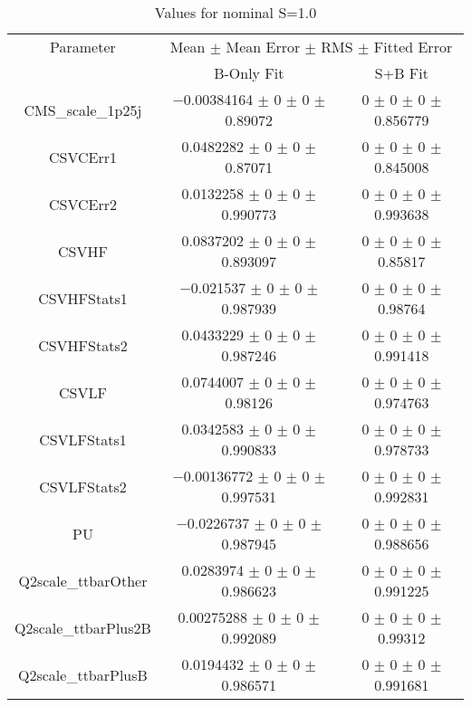 \begin{table}
\centering
\caption{Values for nominal S=1.0}
\begin{tabular}{ccc}
\toprule
Parameter & \multicolumn{2}{c}{Mean $\pm$ Mean Error $\pm$ RMS $\pm$ Fitted Error}\\
 & B-Only Fit & S+B Fit\\
\midrule
CMS\_scale\_1p25j & \num{-0.00384164} $\pm$ \num{0} $\pm$ \num{0} $\pm$ \num{0.89072} & \num{0} $\pm$ \num{0} $\pm$ \num{0} $\pm$ \num{0.856779}\\
CSVCErr1 & \num{0.0482282} $\pm$ \num{0} $\pm$ \num{0} $\pm$ \num{0.87071} & \num{0} $\pm$ \num{0} $\pm$ \num{0} $\pm$ \num{0.845008}\\
CSVCErr2 & \num{0.0132258} $\pm$ \num{0} $\pm$ \num{0} $\pm$ \num{0.990773} & \num{0} $\pm$ \num{0} $\pm$ \num{0} $\pm$ \num{0.993638}\\
CSVHF & \num{0.0837202} $\pm$ \num{0} $\pm$ \num{0} $\pm$ \num{0.893097} & \num{0} $\pm$ \num{0} $\pm$ \num{0} $\pm$ \num{0.85817}\\
CSVHFStats1 & \num{-0.021537} $\pm$ \num{0} $\pm$ \num{0} $\pm$ \num{0.987939} & \num{0} $\pm$ \num{0} $\pm$ \num{0} $\pm$ \num{0.98764}\\
CSVHFStats2 & \num{0.0433229} $\pm$ \num{0} $\pm$ \num{0} $\pm$ \num{0.987246} & \num{0} $\pm$ \num{0} $\pm$ \num{0} $\pm$ \num{0.991418}\\
CSVLF & \num{0.0744007} $\pm$ \num{0} $\pm$ \num{0} $\pm$ \num{0.98126} & \num{0} $\pm$ \num{0} $\pm$ \num{0} $\pm$ \num{0.974763}\\
CSVLFStats1 & \num{0.0342583} $\pm$ \num{0} $\pm$ \num{0} $\pm$ \num{0.990833} & \num{0} $\pm$ \num{0} $\pm$ \num{0} $\pm$ \num{0.978733}\\
CSVLFStats2 & \num{-0.00136772} $\pm$ \num{0} $\pm$ \num{0} $\pm$ \num{0.997531} & \num{0} $\pm$ \num{0} $\pm$ \num{0} $\pm$ \num{0.992831}\\
PU & \num{-0.0226737} $\pm$ \num{0} $\pm$ \num{0} $\pm$ \num{0.987945} & \num{0} $\pm$ \num{0} $\pm$ \num{0} $\pm$ \num{0.988656}\\
Q2scale\_ttbarOther & \num{0.0283974} $\pm$ \num{0} $\pm$ \num{0} $\pm$ \num{0.986623} & \num{0} $\pm$ \num{0} $\pm$ \num{0} $\pm$ \num{0.991225}\\
Q2scale\_ttbarPlus2B & \num{0.00275288} $\pm$ \num{0} $\pm$ \num{0} $\pm$ \num{0.992089} & \num{0} $\pm$ \num{0} $\pm$ \num{0} $\pm$ \num{0.99312}\\
Q2scale\_ttbarPlusB & \num{0.0194432} $\pm$ \num{0} $\pm$ \num{0} $\pm$ \num{0.986571} & \num{0} $\pm$ \num{0} $\pm$ \num{0} $\pm$ \num{0.991681}\\

\end{tabular}
\end{table}
